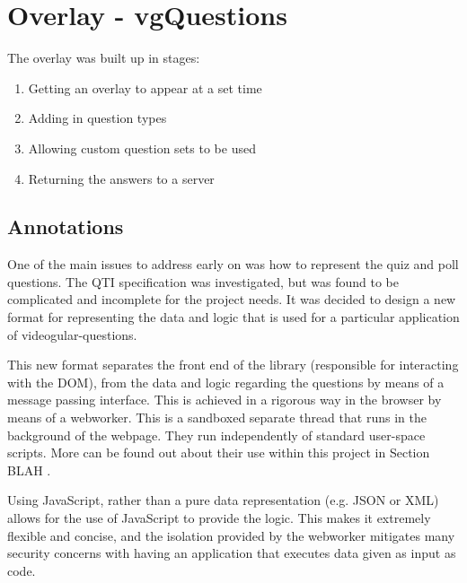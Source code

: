\chapter{Overlay - vgQuestions} \label{Chapter:Overlay}

The overlay was built up in stages:
\begin{enumerate}
\item Getting an overlay to appear at a set time
\item Adding in question types
\item Allowing custom question sets to be used
\item Returning the answers to a server
\end{enumerate}

\section{Annotations}
\label{Section:Annotations}

One of the main issues to address early on was how to represent the quiz and
poll questions. The \gls{QTI} specification was
investigated, but was found to be complicated and incomplete  for the project needs. It was decided to design a new
format for representing the data and logic that is used for a particular
application of videogular-questions.

This new format separates the front end of the library (responsible for
interacting with the \gls{DOM}), from the data and logic regarding the questions by
means of a message passing interface. This is achieved in a rigorous way in the
browser by means of a \gls{webworker}. This is a sandboxed separate thread that runs
in the background of the webpage. They run independently of standard user-space
scripts.  More can be found out about their use within this project in Section
BLAH .

Using JavaScript, rather than a pure data representation (e.g. JSON or XML)
allows for the use of JavaScript to provide the logic. This makes it extremely
flexible and concise, and the isolation provided by the \gls{webworker} mitigates
many security concerns with having an application that executes data given as
input as code.

